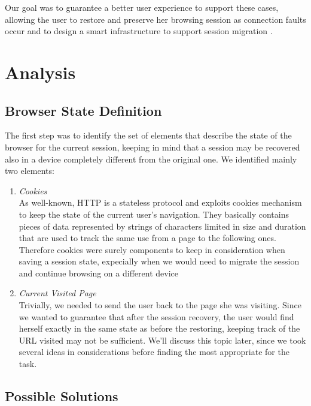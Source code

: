 \documentclass[11pt,a4paper]{article}
\begin{document}
Our goal was to guarantee a better user experience to support these cases, allowing the user to restore and preserve her browsing session as connection faults occur and to design a smart infrastructure to support session migration .

\newpage

\section{Analysis}


\subsection{Browser State Definition}
The first step was to identify the set of elements that describe the state of the browser for the current session, keeping in mind that a session may be recovered also in a device completely different from the original one.
We identified mainly two elements:
\begin{enumerate}
\item \emph{Cookies} \\
	As well-known, HTTP is a stateless protocol and exploits cookies mechanism to keep the state of the current user’s navigation. They basically contains pieces of data represented by strings of characters limited in size and duration that are used to track the same use from a page to the following ones. Therefore cookies were surely components to keep in consideration when saving a session state, expecially when we would need to migrate the session and continue browsing on a different device

\item \emph{Current Visited Page} \\
	Trivially, we needed to send the user back to the page she was visiting. Since we wanted to guarantee that after the session recovery, the user would find herself exactly in the same 	state as before the restoring, keeping track of the URL visited may not be sufficient. We’ll 	discuss this topic later, since we took several ideas in considerations before finding the most appropriate for the task.
\end{enumerate}

\subsection{Possible Solutions}
\end{document}
